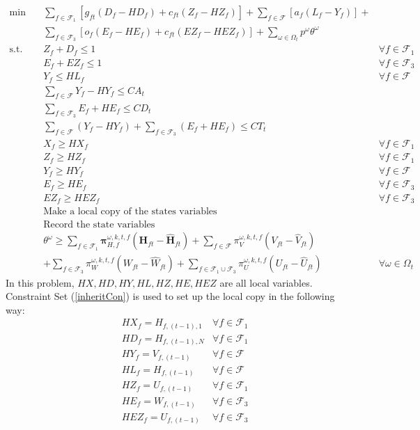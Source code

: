 \documentclass[12pt]{article}
\begin{document}
	\begin{align}
		\min \quad & \sum_{f \in \mathcal{F}_1} \left[ g_{ft} (D_f - HD_f) + c_{ft} (Z_f - HZ_f) \right] + \sum_{f \in \mathcal{F}} \left[ a_f (L_f - Y_f)\right] + &\\
		& \sum_{f \in \mathcal{F}_3} \left[ o_f(E_f - HE_f) + c_{ft}(EZ_f - HEZ_f)\right] + \sum_{\omega \in \Omega_t} p^\omega \theta^\omega &\\
		\text{s.t.} \quad & Z_f + D_f \leq 1 & \forall f \in \mathcal{F}_1\\
		& E_f + EZ_f \leq 1 & \forall f \in \mathcal{F}_3\\
		& Y_f \leq HL_f & \forall f \in \mathcal{F}\\
		& \sum_{f \in \mathcal{F}} Y_f - HY_f \leq CA_t &\\
		& \sum_{f \in \mathcal{F}_3} E_f + HE_f \leq CD_t &\\
		& \sum_{f \in \mathcal{F}} (Y_f - HY_f) + \sum_{f \in \mathcal{F}_3} (E_f + HE_f) \leq CT_t &\\
		& X_f \geq HX_f & \forall f \in \mathcal{F}_1\\
		& Z_f \geq HZ_f & \forall f \in \mathcal{F}_1\\
		& Y_f \geq HY_f & \forall f \in \mathcal{F}\\
		& E_f \geq HE_f & \forall f \in \mathcal{F}_3\\
		& EZ_f \geq HEZ_f & \forall f \in \mathcal{F}_3\\
		& \text{Make a local copy of the states variables}& \label{inheritCon}\\
		& \text{Record the state variables}& \label{passDown}\\
		& \theta^\omega \geq \sum_{f \in \mathcal{F}_1} \mathbf{\pi}_{H,f}^{\omega,k,t,f} (\mathbf{H}_{ft} - \hat{\mathbf{H}}_{ft}) + \sum_{f \in \mathcal{F}}\pi_{V}^{\omega,k,t,f} (V_{ft} - \hat{V}_{ft}) &\\
		& + \sum_{f \in \mathcal{F}_3} \pi_{W}^{\omega,k,t,f} (W_{ft} - \hat{W}_{ft}) + \sum_{f \in \mathcal{F}_1 \cup \mathcal{F}_3} \pi_{U}^{\omega,k,t,f} (U_{ft} - \hat{U}_{ft}) & \forall \omega \in \Omega_t
	\end{align}
	In this problem, \(HX,HD,HY,HL,HZ,HE,HEZ\) are all local variables. Constraint Set (\ref{inheritCon}) is used to set up the local copy in the following way:
	\begin{align*}
		& HX_f = H_{f,(t-1),1}& \forall f \in \mathcal{F}_1\\
		& HD_f = H_{f,(t-1),N}& \forall f \in \mathcal{F}_1\\
		& HY_f = V_{f,(t-1)}& \forall f \in \mathcal{F}\\
		& HL_f = H_{f,(t-1)}& \forall f \in \mathcal{F}\\
		& HZ_f = U_{f,(t-1)}& \forall f \in \mathcal{F}_1\\
		& HE_f = W_{f,(t-1)}& \forall f \in \mathcal{F}_3\\
		& HEZ_f = U_{f,(t-1)}& \forall f \in \mathcal{F}_3\\
	\end{align*}
\end{document}
